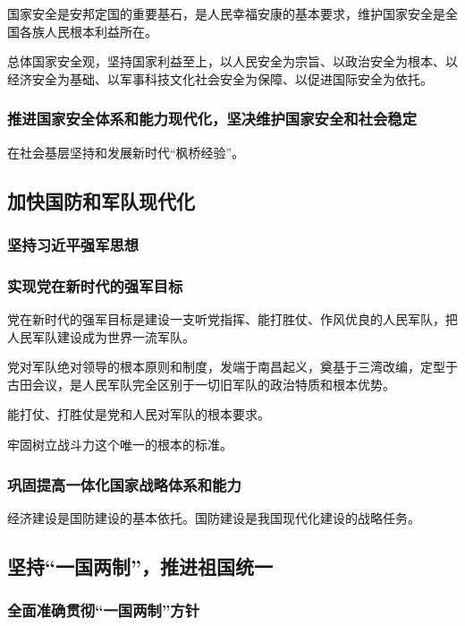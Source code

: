 \documentclass[12pt, a4paper, oneside]{ctexart}
\begin{document}
国家安全是安邦定国的重要基石，是人民幸福安康的基本要求，维护国家安全是全国各族人民根本利益所在。

总体国家安全观，坚持国家利益至上，以人民安全为宗旨、以政治安全为根本、以经济安全为基础、以军事科技文化社会安全为保障、以促进国际安全为依托。

\subsubsection{推进国家安全体系和能力现代化，坚决维护国家安全和社会稳定}

在社会基层坚持和发展新时代“枫桥经验”。

\subsection{加快国防和军队现代化}

\subsubsection{坚持习近平强军思想}

\subsubsection{实现党在新时代的强军目标}

党在新时代的强军目标是建设一支听党指挥、能打胜仗、作风优良的人民军队，把人民军队建设成为世界一流军队。

党对军队绝对领导的根本原则和制度，发端于南昌起义，奠基于三湾改编，定型于古田会议，是人民军队完全区别于一切旧军队的政治特质和根本优势。

能打仗、打胜仗是党和人民对军队的根本要求。

牢固树立战斗力这个唯一的根本的标准。

\subsubsection{巩固提高一体化国家战略体系和能力}

经济建设是国防建设的基本依托。国防建设是我国现代化建设的战略任务。

\subsection{坚持“一国两制”，推进祖国统一}

\subsubsection{全面准确贯彻“一国两制”方针}
\end{document}
